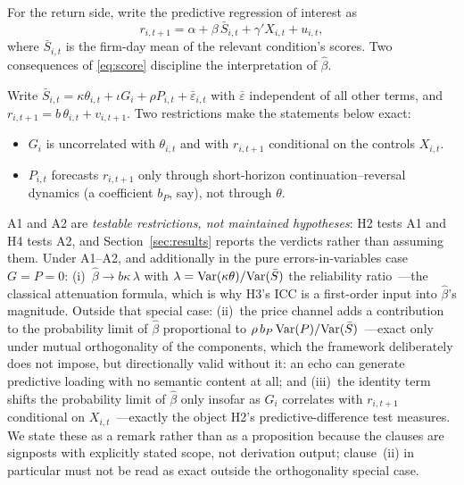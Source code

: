 For the return side, write the predictive regression of interest as
\begin{equation}\label{eq:pred}
r_{i,t+1} = \alpha + \beta\, \bar{S}_{i,t} + \gamma' X_{i,t} + u_{i,t},
\end{equation}
where $\bar{S}_{i,t}$ is the firm-day mean of the relevant condition's scores. Two consequences of \eqref{eq:score} discipline the interpretation of $\hat\beta$.

\begin{remark}\label{prop:attenuation}
Write $\bar{S}_{i,t}=\kappa\theta_{i,t}+\iota G_i+\rho P_{i,t}+\bar\varepsilon_{i,t}$ with $\bar\varepsilon$ independent of all other terms, and $r_{i,t+1}=b\,\theta_{i,t}+v_{i,t+1}$. Two restrictions make the statements below exact:
\begin{itemize}[leftmargin=1.8em, itemsep=1pt, topsep=2pt]
\item[\textbf{A1.}] $G_i$ is uncorrelated with $\theta_{i,t}$ and with $r_{i,t+1}$ conditional on the controls $X_{i,t}$.
\item[\textbf{A2.}] $P_{i,t}$ forecasts $r_{i,t+1}$ only through short-horizon continuation--reversal dynamics (a coefficient $b_P$, say), not through $\theta$.
\end{itemize}
A1 and A2 are \emph{testable restrictions, not maintained hypotheses}: H2 tests A1 and H4 tests A2, and Section~\ref{sec:results} reports the verdicts rather than assuming them. Under A1--A2, and additionally in the pure errors-in-variables case $G=P=0$: (i)~$\hat\beta \to b\kappa\,\lambda$ with $\lambda=\mathrm{Var}(\kappa\theta)/\mathrm{Var}(\bar{S})$ the reliability ratio~---the classical attenuation formula, which is why H3's ICC is a first-order input into $\hat\beta$'s magnitude. Outside that special case: (ii)~the price channel adds a contribution to the probability limit of $\hat\beta$ proportional to $\rho\,b_P\,\mathrm{Var}(P)/\mathrm{Var}(\bar{S})$~---exact only under mutual orthogonality of the components, which the framework deliberately does not impose, but directionally valid without it: an echo can generate predictive loading with no semantic content at all; and (iii)~the identity term shifts the probability limit of $\hat\beta$ only insofar as $G_i$ correlates with $r_{i,t+1}$ conditional on $X_{i,t}$~---exactly the object H2's predictive-difference test measures. We state these as a remark rather than as a proposition because the clauses are signposts with explicitly stated scope, not derivation output; clause~(ii) in particular must not be read as exact outside the orthogonality special case.
\end{remark}

